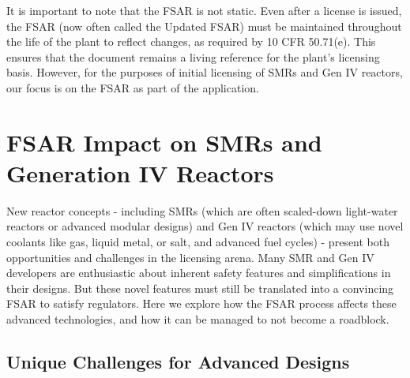 \documentclass[5p,authoryear]{elsarticle}
\begin{document}
\vspace{0.2cm}
It is important to note that the FSAR is not static. Even after a license is issued, the FSAR (now often called the Updated FSAR) must be maintained throughout the life of the plant to reflect changes, as required by 10 CFR 50.71(e). This ensures that the document remains a living reference for the plant's licensing basis. However, for the purposes of initial licensing of SMRs and Gen IV reactors, our focus is on the FSAR as part of the application.

\section{FSAR Impact on SMRs and Generation IV Reactors}

New reactor concepts - including SMRs (which are often scaled-down light-water reactors or advanced modular designs) and Gen IV reactors (which may use novel coolants like gas, liquid metal, or salt, and advanced fuel cycles) - present both opportunities and challenges in the licensing arena. Many SMR and Gen IV developers are enthusiastic about inherent safety features and simplifications in their designs. But these novel features must still be translated into a convincing FSAR to satisfy regulators. Here we explore how the FSAR process affects these advanced technologies, and how it can be managed to not become a roadblock.


\subsection{Unique Challenges for Advanced Designs} \label{Unique Challenges for Advanced Designs}
\vspace{0.2cm}
\end{document}
